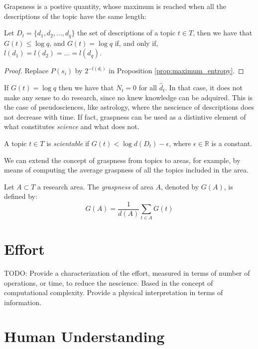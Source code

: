 Grapsness is a postive quantity, whose maximum is reached when all the descriptions of the topic have the same length:

\begin{proposition}
Let $D_t = \{ d_1, d_2, \ldots, d_q \}$ the set of descriptions of a topic $t \in T$, then we have that $G(t) \leq \log q$, and $G(t) = \log q$ if, and only if, $l(d_1) = l(d_2) = \ldots = l(d_q)$.
\end{proposition}
\begin{proof}
Replace $P(s_i)$ by $2^{-l(d_i)}$ in Proposition \ref{prop:maximum_entropy}.
\end{proof}

If $G(t) = \log q$ then we have that $N_t = 0$ for all $\hat{d}_t$. In that case, it does not make any sense to do research, since no knew knowledge can be adquired. This is the case of pseudosciences, like astrology, where the nescience of descriptions does not decrease with time. If fact, graspness can be used as a distintive element of what constitutes \emph{science} and what does not.

\begin{definition}
A topic $t \in T$ is \emph{scientable} if $G(t) < \log d(D_t) - \epsilon$, where $\epsilon \in \mathbb{R}$ is a constant.
\end{definition}

We can extend the concept of graspness from topics to areas, for example, by means of computing the average graspness of all the topics included in the area.

\begin{definition}
Let $A \subset T$ a research area. The \emph{graspness} of area $A$, denoted by $G(A)$, is defined by:
\[
G(A) = \frac{1}{d(A)} \sum_{t \in A} G(t)
\]
\end{definition}

%
%
\section{Effort}

{\color{red} TODO: Provide a characterization of the effort, measured in terms of number of operations, or time, to reduce the nescience. Based in the concept of computational complexity. Provide a physical interpretation in terms of information.}

%
%
\section{Human Understanding}

